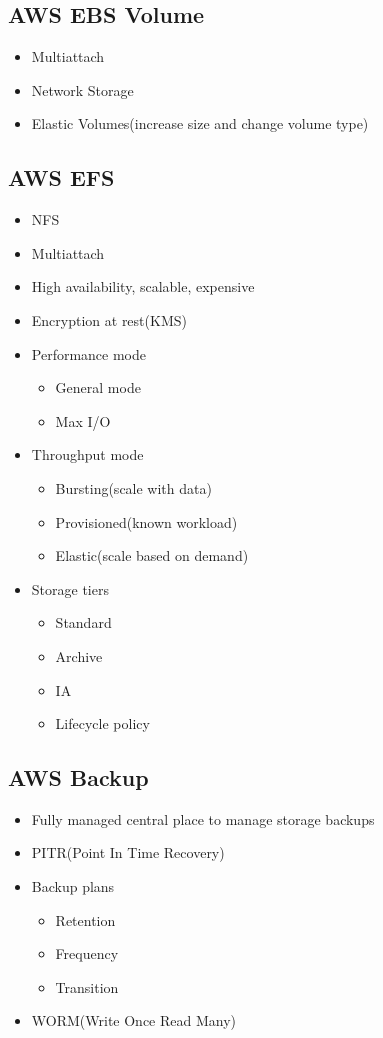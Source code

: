 \documentclass[../../main.tex]{subfiles}
\begin{document}
\subsection{AWS EBS Volume}
\begin{itemize}
    \item Multiattach
    \item Network Storage
    \item Elastic Volumes(increase size and change volume type)
\end{itemize}

\subsection{AWS EFS}
\begin{itemize}
    \item NFS
    \item Multiattach
    \item High availability, scalable, expensive
    \item Encryption at rest(KMS)
    \item Performance mode
    \begin{itemize}
        \item General mode
        \item Max I/O
    \end{itemize}
    \item Throughput mode
    \begin{itemize}
        \item Bursting(scale with data)
        \item Provisioned(known workload)
        \item Elastic(scale based on demand)
    \end{itemize}
    \item Storage tiers
    \begin{itemize}
        \item Standard
        \item Archive
        \item IA
        \item Lifecycle policy
    \end{itemize}
\end{itemize}

\subsection{AWS Backup}
\begin{itemize}
    \item Fully managed central place to manage storage backups
    \item PITR(Point In Time Recovery)
    \item Backup plans
    \begin{itemize}
        \item Retention
        \item Frequency
        \item Transition
    \end{itemize}
    \item WORM(Write Once Read Many)
\end{itemize}
\end{document}
